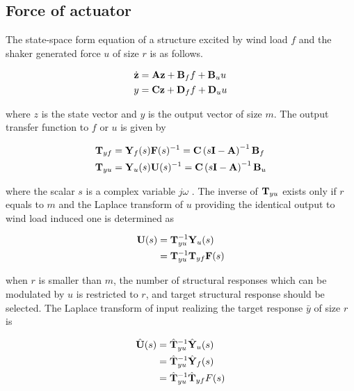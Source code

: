 \subsection{Force of actuator}
The state-space form equation of a structure excited by wind load $f$ and the shaker generated force $u$ of size $r$ is as follows.

\begin{equation}
\begin{aligned}
\dot{\mathbf{z}} &=\mathbf{A}\mathbf{z}+\mathbf{B}_{f}f + \mathbf{B}_{u}u \\
y &= \mathbf{C}\mathbf{z}+\mathbf{D}_{f}f+\mathbf{D}_{u}u
\end{aligned}
\label{eq:6-1}
\end{equation}

where $z$ is the state vector and $y$ is the output vector of size $m$. The output transfer function to $f$ or $u$ is given by

\begin{equation}
\begin{aligned}
\mathbf{T}_{yf} &= \mathbf{Y}_{f}(s)\mathbf{F}(s)^{-1} = \mathbf{C}\left(s\mathbf{I}-\mathbf{A}\right)^{-1}\mathbf{B}_{f} \\
\mathbf{T}_{yu} &= \mathbf{Y}_{u}(s)\mathbf{U}(s)^{-1} = \mathbf{C}\left(s\mathbf{I}-\mathbf{A}\right)^{-1}\mathbf{B}_{u} \\
\end{aligned}
\label{eq:6-2}
\end{equation}

where the scalar $s$ is a complex variable $j\omega$ . The inverse of $\mathbf{T}_{yu}$ exists only if $r$ equals to $m$ and the Laplace transform of $u$ providing the identical output to wind load induced one is determined as

\begin{equation}
\begin{aligned}
\mathbf{U}(s)&=\mathbf{T}_{yu}^{-1}\mathbf{Y}_{u}(s)\\
&=\mathbf{T}_{yu}^{-1}\mathbf{T}_{yf}\mathbf{F}(s)
\end{aligned}
\label{eq:6-3}
\end{equation}

when $r$ is smaller than $m$, the number of structural responses which can be modulated by $u$ is restricted to $r$, and target structural response should be selected. The Laplace transform of input realizing the target response $\bar{y}$ of size $r$ is

\begin{equation}
\begin{aligned}
\hat{\mathbf{U}}(s)&=\hat{\mathbf{T}}_{yu}^{-1}\hat{\mathbf{Y}}_{u}(s)\\
&=\hat{\mathbf{T}}_{yu}^{-1}\hat{\mathbf{Y}}_{f}(s)\\
&=\hat{\mathbf{T}}_{yu}^{-1}\hat{\mathbf{T}}_{yf}F(s)
\end{aligned}
\label{eq:6-4}
\end{equation}

